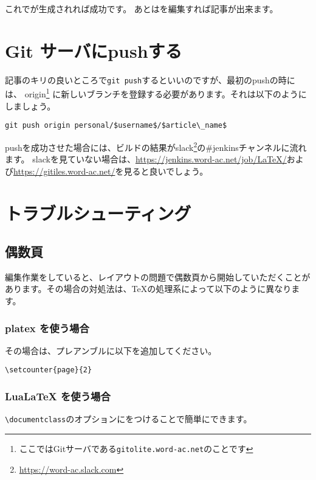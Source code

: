 これでが生成されれば成功です。
あとはを編集すれば記事が出来ます。

\section{Git サーバにpushする}

記事のキリの良いところで\lstinline|git push|するといいのですが、最初のpushの時には、
origin\footnote{ここではGitサーバである\texttt{gitolite.word-ac.net}のことです}%
に新しいブランチを登録する必要があります。それは以下のようにしましょう。

\begin{lstlisting}[mathescape]
git push origin personal/$username$/$article\_name$
\end{lstlisting}

pushを成功させた場合には、ビルドの結果がslack\footnote{\url{https://word-ac.slack.com}}の\#jenkinsチャンネルに流れます。
slackを見ていない場合は、\url{https://jenkins.word-ac.net/job/LaTeX/}および\url{https://gitiles.word-ac.net/}を見ると良いでしょう。

\section{トラブルシューティング}

\subsection{偶数頁}

編集作業をしていると、レイアウトの問題で偶数頁から開始していただくことがあります。その場合の対処法は、\TeX の処理系によって以下のように異なります。

\subsubsection{platex を使う場合}

その場合は、プレアンブルに以下を追加してください。

\begin{lstlisting}[mathescape]
\setcounter{page}{2}
\end{lstlisting}

\subsubsection{LuaLaTeX を使う場合}

\lstinline|\documentclass|のオプションにをつけることで簡単にできます。

